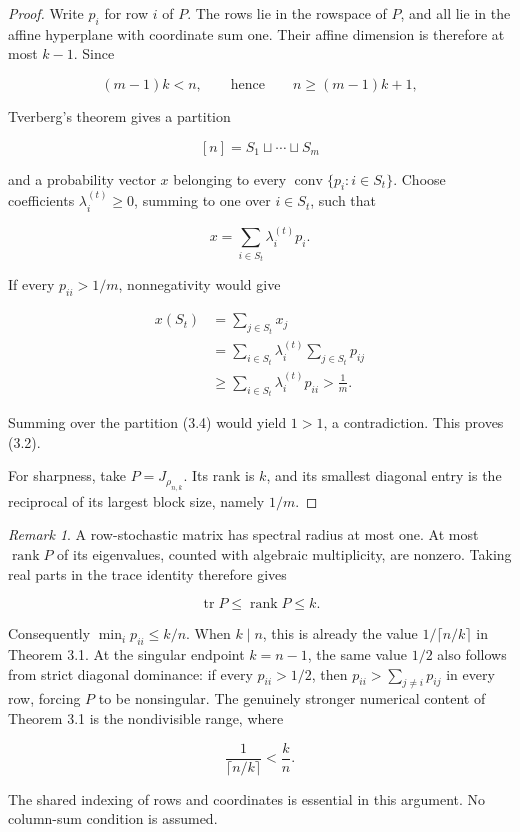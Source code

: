 \documentclass[11pt]{article}
\theoremstyle{remark}
\newtheorem*{remark}{Remark}
\begin{document}
\begin{proof}
Write \(p_i\) for row \(i\) of \(P\). The rows lie in the
rowspace of \(P\), and all lie in the affine hyperplane with coordinate sum
one. Their affine dimension is therefore at most \(k-1\). Since

\[
 (m-1)k<n,
 \qquad\text{hence}\qquad
 n\geq(m-1)k+1,                                             \tag{3.3}
\]

Tverberg's theorem gives a partition

\[
 [n]=S_1\sqcup\cdots\sqcup S_m                             \tag{3.4}
\]

and a probability vector \(x\) belonging to every
\(\operatorname{conv}\{p_i:i\in S_t\}\). Choose coefficients
\(\lambda_i^{(t)}\geq0\), summing to one over \(i\in S_t\), such that

\[
 x=\sum_{i\in S_t}\lambda_i^{(t)}p_i.                      \tag{3.5}
\]

If every \(p_{ii}>1/m\), nonnegativity would give

\[
 \begin{aligned}
 x(S_t)
 &=\sum_{j\in S_t}x_j\\
 &=\sum_{i\in S_t}\lambda_i^{(t)}
   \sum_{j\in S_t}p_{ij}\\
 &\geq\sum_{i\in S_t}\lambda_i^{(t)}p_{ii}
 >\frac1m.
 \end{aligned}                                             \tag{3.6}
\]

Summing over the partition (3.4) would yield \(1>1\), a contradiction.
This proves (3.2).

For sharpness, take \(P=J_{\rho_{n,k}}\). Its rank is \(k\), and its
smallest diagonal entry is the reciprocal of its largest block size, namely
\(1/m\).
\end{proof}

\begin{remark}
A
row-stochastic matrix has spectral radius at most one. At most
\(\operatorname{rank}P\) of its eigenvalues, counted with algebraic
multiplicity, are nonzero. Taking real parts in the trace identity therefore
gives

\[
 \operatorname{tr}P\leq\operatorname{rank}P\leq k.
\]

Consequently \(\min_i p_{ii}\leq k/n\). When \(k\mid n\), this is already
the value \(1/\lceil n/k\rceil\) in Theorem 3.1. At the singular endpoint
\(k=n-1\), the same value \(1/2\) also follows from strict diagonal
dominance: if every \(p_{ii}>1/2\), then
\(p_{ii}>\sum_{j\ne i}p_{ij}\) in every row, forcing \(P\) to be
nonsingular. The genuinely stronger numerical content of Theorem 3.1 is
the nondivisible range, where

\[
 \frac1{\lceil n/k\rceil}<\frac{k}{n}.
\]

The shared indexing of rows and coordinates is essential in this argument.
No column-sum condition is assumed.
\end{remark}
\end{document}
